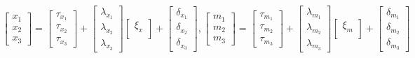 \documentclass[
  man]{apa7}
\begin{document}
\begin{align}
    \begin{bmatrix}
        x_{1} \\
        x_{2} \\ 
        x_{3}
    \end{bmatrix} =
    \begin{bmatrix}
        \tau_{x_{1}} \\
        \tau_{x_{2}} \\ 
        \tau_{x_{3}}
    \end{bmatrix} +
    \begin{bmatrix}
        \lambda_{x_{1}} \\
        \lambda_{x_{2}} \\ 
        \lambda_{x_{3}}
    \end{bmatrix}
    \begin{bmatrix}
        \xi_{x} \\
    \end{bmatrix} +
    \begin{bmatrix}
        \delta_{x_{1}} \\
        \delta_{x_{2}} \\ 
        \delta_{x_{3}}
    \end{bmatrix}, %
    \begin{bmatrix}
        m_{1} \\
        m_{2} \\ 
        m_{3}
    \end{bmatrix} =
    \begin{bmatrix}
        \tau_{m_{1}} \\
        \tau_{m_{2}} \\ 
        \tau_{m_{3}}
    \end{bmatrix} +
    \begin{bmatrix}
        \lambda_{m_{1}} \\
        \lambda_{m_{2}} \\ 
        \lambda_{m_{3}}
    \end{bmatrix}
    \begin{bmatrix}
        \xi_{m} \\
    \end{bmatrix} +
    \begin{bmatrix}
        \delta_{m_{1}} \\
        \delta_{m_{2}} \\ 
        \delta_{m_{3}}
    \end{bmatrix}
\end{align}
\end{document}
